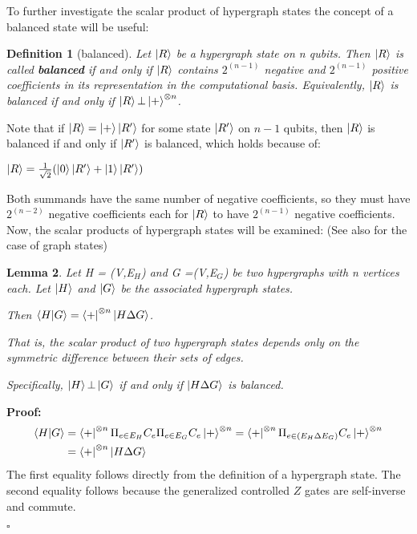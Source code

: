 \documentclass[12pt]{iopart}
\newtheorem{lemma}{Lemma}
\newtheorem{definition}[lemma]{Definition}
\begin{document}
To further investigate the scalar product of hypergraph states the concept of a balanced state will be useful:
\begin{samepage}

\begin{definition}[balanced]
\label{balanced}
Let $\ket{R}$ be a hypergraph state on n qubits. Then $\ket{R}$ is called \textbf{balanced} if and only if $\ket{R}$ contains $2^{(n-1)}$ negative and $2^{(n-1)}$ positive  coefficients in its representation in the computational basis. Equivalently, $\ket{R}$ is balanced if and only if $\ket{R} \bot \ket{+}^{\otimes n} $.
\end{definition} 
\end{samepage}

Note that if $\ket{R} = \ket{+}\ket{R^{\prime}}$ for some state $\ket{R^{\prime}}$ on $n-1$ qubits, then $\ket{R}$ is balanced if and only if $\ket{R^{\prime}}$ is balanced, which holds because of:

$\ket{R} = \frac{1}{\sqrt{2}}( \ket{0}\ket{R^\prime} + \ket{1}\ket{R^\prime})$

Both summands have the same number of negative coefficients, so they must have $2^{(n-2)}$ negative coefficients each for $\ket{R}$ to have $2^{(n-1)}$ negative coefficients.
\\

Now, the scalar products of hypergraph states will be examined: (See also \cite{ScalarGraph} for the case of graph states)

\begin{lemma}
\label{ortho}
Let H = (V,E$_H$) and G =(V,E$_G$) be two hypergraphs with n vertices each. Let $\ket{H}$ and $\ket{G}$ be the associated hypergraph states.

Then $\braket{H|G} = \bra{+}^{\otimes n} \ket{H \Delta G}$.

That is, the scalar product of two hypergraph states depends only on the symmetric difference between their sets of edges.

Specifically, $\ket{H} \bot \ket{G}$ if and only if $\ket{H \Delta G}$ is balanced.
\end{lemma}

\textbf{Proof:}
\begin{eqnarray}
\braket{H|G}& = \bra{+}^{\otimes n}\Pi_{e \in E_H} C_e \Pi_{e \in E_G} C_e \ket{+}^{\otimes n} = \bra{+}^{\otimes n}\Pi_{e \in (E_H \Delta E_G)} C_e \ket{+}^{\otimes n}\nonumber \\ &=  \bra{+}^{\otimes n}\ket{H \Delta G}
\end{eqnarray}
The first equality follows directly from the definition of a hypergraph state. The second equality follows because the generalized controlled $Z$ gates are self-inverse and commute.
\begin{flushright}
$\square$
\end{flushright}
\end{document}
